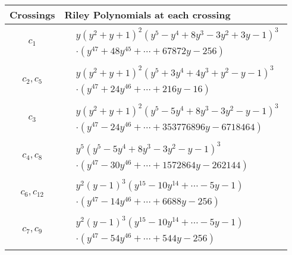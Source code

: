 \documentclass[1p]{elsarticle_modified}
\theoremstyle{definition}
\begin{document}
\begin{tabular}{m{50pt}|m{274pt}}
Crossings & \hspace{64pt}Riley Polynomials at each crossing \\
\hline $$\begin{aligned}c_{1}\end{aligned}$$&$\begin{aligned}
&y(y^2+y+1)^2(y^5- y^4+8 y^3-3 y^2+3 y-1)^3\\
&\cdot(y^{47}+48 y^{45}+\cdots+67872 y-256)
\end{aligned}$\\
\hline $$\begin{aligned}c_{2},c_{5}\end{aligned}$$&$\begin{aligned}
&y(y^2+y+1)^2(y^5+3 y^4+4 y^3+y^2- y-1)^3\\
&\cdot(y^{47}+24 y^{46}+\cdots+216 y-16)
\end{aligned}$\\
\hline $$\begin{aligned}c_{3}\end{aligned}$$&$\begin{aligned}
&y(y^2+y+1)^2(y^5-5 y^4+8 y^3-3 y^2- y-1)^3\\
&\cdot(y^{47}-24 y^{46}+\cdots+353776896 y-6718464)
\end{aligned}$\\
\hline $$\begin{aligned}c_{4},c_{8}\end{aligned}$$&$\begin{aligned}
&y^5(y^5-5 y^4+8 y^3-3 y^2- y-1)^3\\
&\cdot(y^{47}-30 y^{46}+\cdots+1572864 y-262144)
\end{aligned}$\\
\hline $$\begin{aligned}c_{6},c_{12}\end{aligned}$$&$\begin{aligned}
&y^2(y-1)^3(y^{15}-10 y^{14}+\cdots-5 y-1)\\
&\cdot(y^{47}-14 y^{46}+\cdots+6688 y-256)
\end{aligned}$\\
\hline $$\begin{aligned}c_{7},c_{9}\end{aligned}$$&$\begin{aligned}
&y^2(y-1)^3(y^{15}-10 y^{14}+\cdots-5 y-1)\\
&\cdot(y^{47}-54 y^{46}+\cdots+544 y-256)
\end{aligned}$\\

\end{tabular}
\end{document}
